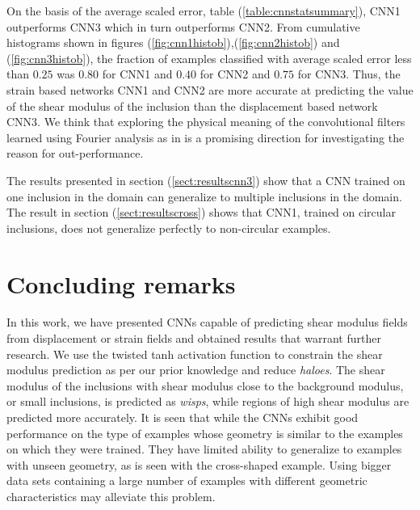 \documentclass[12pt]{article}
\begin{document}
On the basis of the average scaled error, table (\ref{table:cnnstatsummary}),  CNN1 outperforms CNN3 which in turn outperforms CNN2. From cumulative histograms shown in figures (\ref{fig:cnn1histob}),(\ref{fig:cnn2histob}) and (\ref{fig:cnn3histob}), the fraction of examples classified with average scaled error less than $0.25$ was $0.80$ for CNN1 and $0.40$ for CNN2 and $0.75$ for CNN3. Thus, the strain based networks CNN1 and CNN2 are more accurate at predicting the value of the shear modulus of the inclusion than the displacement based network CNN3. We think that exploring the physical meaning of the convolutional filters learned using Fourier analysis as in \cite{paper:pateloberai2019} is a promising direction for investigating the reason for out-performance.

The results presented in section (\ref{sect:resultscnn3}) show that a CNN trained on one inclusion in the domain can generalize to multiple inclusions in the domain. The result in section (\ref{sect:resultscross}) shows that CNN1, trained on circular inclusions, does not generalize perfectly to non-circular examples. 
%
\section{Concluding remarks}
In this work, we have presented CNNs capable of predicting shear modulus fields from displacement or strain fields and obtained results that warrant further research. We use the twisted tanh activation function to constrain the shear modulus prediction as per our prior knowledge and reduce \textit{haloes}. The shear modulus of the inclusions with shear modulus close to the background modulus, or small inclusions, is predicted as \textit{wisps}, while regions of high shear modulus are predicted more accurately. It is seen that while the CNNs exhibit good performance on the type of examples whose geometry is similar to the examples on which they were trained. They have limited ability to generalize to examples with unseen geometry, as is seen with the cross-shaped example. Using bigger data sets containing a large number of examples with different geometric characteristics may alleviate this problem.
%
\end{document}
